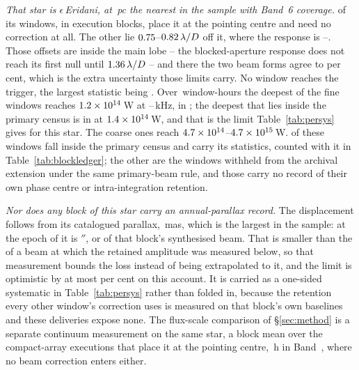 \emph{That star is $\epsilon$\,Eridani, at \BmEpsDistPc\,pc the nearest in the
sample with Band~6 coverage.} \BmEpsNOn{} of its \BmEpsNWin{} windows, in
\BmEpsNBlock{} execution blocks, place it at the pointing centre and need no
correction at all. The other \BmEpsNOff{} lie
$0.75$--$0.82\,\lambda/D$ off it, where the response is
\BmEpsRespLo--\BmEpsRespHi. Those offsets are inside the main lobe -- the
blocked-aperture response does not reach its first null until
$1.36\,\lambda/D$ -- and there the two beam forms agree to
\BmEpsAgreePct{} per cent, which is the extra uncertainty those limits carry.
No window reaches the trigger, the largest statistic being \BmEpsTMax. Over
\BmEpsHours\,window-hours the deepest of the \BmEpsNFine{} fine windows
reaches $1.2\times10^{14}$\,W at
\BmEpsChanFineKHzLo--\BmEpsChanFineKHzHi\,kHz, in \BmEpsExtEb; the deepest
that lies inside the primary census is in \BmEpsCenEb{} at
$1.4\times10^{14}$\,W, and that is the limit Table~\ref{tab:persys} gives for
this star. The
\BmEpsNCoarse{} coarse ones reach
$4.7\times10^{14}$--$4.7\times10^{15}$\,W. \BmEpsNCensus{} of these
windows fall inside the primary census and carry its statistics, counted with
it in Table~\ref{tab:blockledger}; the other \BmEpsNExt{} are the
\LdgExtWithheldWin{} windows withheld from the archival extension under the
same primary-beam rule, and those carry no record of their own phase centre or
intra-integration retention.

\emph{Nor does any block of this star carry an annual-parallax record.} The
displacement follows from its catalogued parallax, \BmEpsPlxMas\,mas, which
is the largest in the sample: at the epoch of \BmEpsCenEb{} it is
\BmEpsPxArcsec$''$, or \BmEpsPxBeams{} of that block's synthesised beam.
That is smaller than the \SensPxSmallBeams{} of a beam at which the retained
amplitude was measured below, so that measurement bounds the loss instead of
being extrapolated to it, and the limit is optimistic by at most
\BmEpsPxBoundPct{} per cent on this account. It is carried as a one-sided
systematic in Table~\ref{tab:persys} rather than folded in, because the
retention every other window's correction uses is measured on that block's
own baselines and these deliveries expose none. The
flux-scale
comparison of \S\ref{sec:method} is a separate continuum measurement on the
same star, a block mean over the \PxEpsN{} compact-array executions that place
it at the pointing centre, \PxEpsHours\,h in Band~\PxEpsBand, where no beam
correction enters either.

